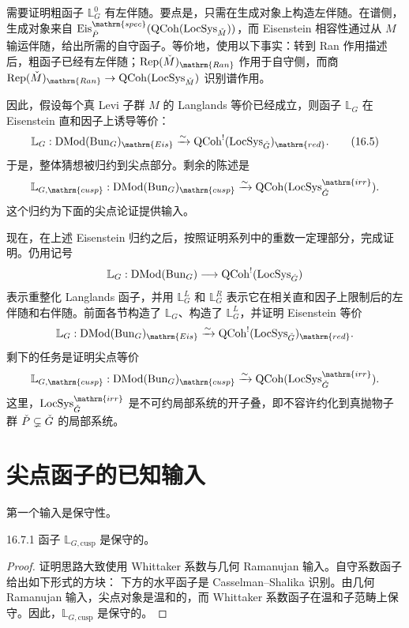 需要证明粗函子 $\mathbb L_G^0$ 有左伴随。要点是，只需在生成对象上构造左伴随。在谱侧，生成对象来自 $\operatorname{Eis}^{\mathrm{spec}}_{\check P}(\QCoh(\LocSys_{\check M}))$，而 Eisenstein 相容性通过从 $M$ 输运伴随，给出所需的自守函子。等价地，使用以下事实：转到 Ran 作用描述后，粗函子已经有左伴随；$\Rep(\check M)_{\mathrm{Ran}}$ 作用于自守侧，而商 $\Rep(\check M)_{\mathrm{Ran}}\to\QCoh(\LocSys_{\check M})$ 识别谱作用。

因此，假设每个真 Levi 子群 $M$ 的 Langlands 等价已经成立，则函子 $\mathbb L_G$ 在 Eisenstein 直和因子上诱导等价\cite{CCF24}：
\begin{equation}
\mathbb L_G:\DMod(\Bun_G)_{\mathrm{Eis}}\xrightarrow{\sim}\QCoh^!(\LocSys_{\checkG})_{\mathrm{red}}.
\tag{16.5}\label{eq:16.5}
\end{equation}
于是，整体猜想被归约到尖点部分。剩余的陈述是
\[\mathbb L_{G,\mathrm{cusp}}:\DMod(\Bun_G)_{\mathrm{cusp}}\xrightarrow{\sim}\QCoh(\LocSys^{\mathrm{irr}}_{\checkG}).\]
这个归约为下面的尖点论证提供输入。

现在，在上述 Eisenstein 归约之后，按照证明系列中的重数一定理部分\cite{GR24b}，完成证明。仍用记号
\[\mathbb L_G:\operatorname{DMod}(\operatorname{Bun}_G)\longrightarrow\operatorname{QCoh}^!(\operatorname{LocSys}_{\check{G}})\]
表示重整化 Langlands 函子，并用 $\mathbb L_G^L$ 和 $\mathbb L_G^R$ 表示它在相关直和因子上限制后的左伴随和右伴随。前面各节构造了 $\mathbb L_G$、构造了 $\mathbb L_G^L$，并证明 Eisenstein 等价
\[\mathbb L_G:\DMod(\Bun_G)_{\mathrm{Eis}}\xrightarrow{\sim}\QCoh^!(\LocSys_{\checkG})_{\mathrm{red}}.\]
剩下的任务是证明尖点等价
\[\mathbb L_{G,\mathrm{cusp}}:\DMod(\Bun_G)_{\mathrm{cusp}}\xrightarrow{\sim}\QCoh(\LocSys^{\mathrm{irr}}_{\checkG}).\]
这里，$\LocSys^{\mathrm{irr}}_{\checkG}$ 是不可约局部系统的开子叠，即不容许约化到真抛物子群 $\check P\subsetneq\check{G}$ 的局部系统。

\section{尖点函子的已知输入}\label{sec:16.7}
第一个输入是保守性。
\begin{theorem}{}{16.7.1}
函子 $\mathbb L_{G,\mathrm{cusp}}$ 是保守的。
\end{theorem}
\begin{proof}
证明思路大致使用 Whittaker 系数与几何 Ramanujan 输入\cite{FR25,Ber21,GR24b}。自守系数函子给出如下形式的方块：
下方的水平函子是 Casselman–Shalika 识别。由几何 Ramanujan 输入，尖点对象是温和的，而 Whittaker 系数函子在温和子范畴上保守。因此，$\mathbb L_{G,\mathrm{cusp}}$ 是保守的。
\end{proof}

